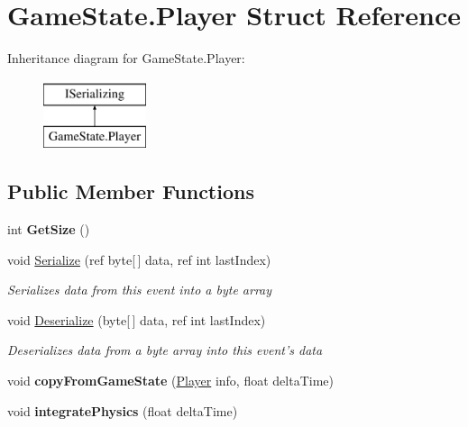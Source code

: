 \hypertarget{struct_game_state_1_1_player}{\section{Game\-State.\-Player Struct Reference}
\label{struct_game_state_1_1_player}
}
Inheritance diagram for Game\-State.\-Player\-:\begin{figure}[H]
\begin{center}
\leavevmode
\includegraphics[height=2.000000cm]{struct_game_state_1_1_player}
\end{center}
\end{figure}
\subsection*{Public Member Functions}
\begin{DoxyCompactItemize}
\item 
\hypertarget{struct_game_state_1_1_player_a58e1b4e7eaca487703abf36826e41c45}{int {\bfseries Get\-Size} ()}\label{struct_game_state_1_1_player_a58e1b4e7eaca487703abf36826e41c45}

\item 
void \hyperlink{struct_game_state_1_1_player_aa8df830f0a0bcfbfb263a634d125c3a5}{Serialize} (ref byte\mbox{[}$\,$\mbox{]} data, ref int last\-Index)
\begin{DoxyCompactList}\small\item\em Serializes data from this event into a byte array \end{DoxyCompactList}\item 
void \hyperlink{struct_game_state_1_1_player_aaf7c5b93f45be35c3501626cb6759c0b}{Deserialize} (byte\mbox{[}$\,$\mbox{]} data, ref int last\-Index)
\begin{DoxyCompactList}\small\item\em Deserializes data from a byte array into this event's data \end{DoxyCompactList}\item 
\hypertarget{struct_game_state_1_1_player_ace7e3625cf1996b8c56bcafae36673af}{void {\bfseries copy\-From\-Game\-State} (\hyperlink{struct_game_state_1_1_player}{Player} info, float delta\-Time)}\label{struct_game_state_1_1_player_ace7e3625cf1996b8c56bcafae36673af}

\item 
\hypertarget{struct_game_state_1_1_player_a59ac624b5378e8253ac70d827febfe6a}{void {\bfseries integrate\-Physics} (float delta\-Time)}\label{struct_game_state_1_1_player_a59ac624b5378e8253ac70d827febfe6a}

\end{DoxyCompactItemize}
